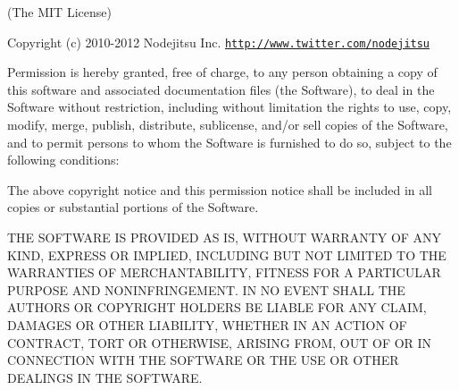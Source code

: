 (The M\+IT License)

Copyright (c) 2010-\/2012 Nodejitsu Inc. \href{http://www.twitter.com/nodejitsu}{\tt http\+://www.\+twitter.\+com/nodejitsu}

Permission is hereby granted, free of charge, to any person obtaining a copy of this software and associated documentation files (the \textquotesingle{}Software\textquotesingle{}), to deal in the Software without restriction, including without limitation the rights to use, copy, modify, merge, publish, distribute, sublicense, and/or sell copies of the Software, and to permit persons to whom the Software is furnished to do so, subject to the following conditions\+:

The above copyright notice and this permission notice shall be included in all copies or substantial portions of the Software.

T\+HE S\+O\+F\+T\+W\+A\+RE IS P\+R\+O\+V\+I\+D\+ED \textquotesingle{}AS IS\textquotesingle{}, W\+I\+T\+H\+O\+UT W\+A\+R\+R\+A\+N\+TY OF A\+NY K\+I\+ND, E\+X\+P\+R\+E\+SS OR I\+M\+P\+L\+I\+ED, I\+N\+C\+L\+U\+D\+I\+NG B\+UT N\+OT L\+I\+M\+I\+T\+ED TO T\+HE W\+A\+R\+R\+A\+N\+T\+I\+ES OF M\+E\+R\+C\+H\+A\+N\+T\+A\+B\+I\+L\+I\+TY, F\+I\+T\+N\+E\+SS F\+OR A P\+A\+R\+T\+I\+C\+U\+L\+AR P\+U\+R\+P\+O\+SE A\+ND N\+O\+N\+I\+N\+F\+R\+I\+N\+G\+E\+M\+E\+NT. IN NO E\+V\+E\+NT S\+H\+A\+LL T\+HE A\+U\+T\+H\+O\+RS OR C\+O\+P\+Y\+R\+I\+G\+HT H\+O\+L\+D\+E\+RS BE L\+I\+A\+B\+LE F\+OR A\+NY C\+L\+A\+IM, D\+A\+M\+A\+G\+ES OR O\+T\+H\+ER L\+I\+A\+B\+I\+L\+I\+TY, W\+H\+E\+T\+H\+ER IN AN A\+C\+T\+I\+ON OF C\+O\+N\+T\+R\+A\+CT, T\+O\+RT OR O\+T\+H\+E\+R\+W\+I\+SE, A\+R\+I\+S\+I\+NG F\+R\+OM, O\+UT OF OR IN C\+O\+N\+N\+E\+C\+T\+I\+ON W\+I\+TH T\+HE S\+O\+F\+T\+W\+A\+RE OR T\+HE U\+SE OR O\+T\+H\+ER D\+E\+A\+L\+I\+N\+GS IN T\+HE S\+O\+F\+T\+W\+A\+RE. 